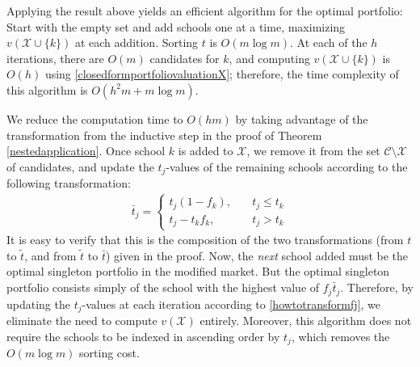 \documentclass[12pt]{article} %
\DeclareMathOperator*{\argmax}{arg\,max}
\newtheorem{theorem}{Theorem}
\theoremstyle{definition}
\newtheorem{theorem}{정리}
\theoremstyle{definition}
\begin{document}
Applying the result above yields an efficient algorithm for the optimal portfolio: Start with the empty set and add schools one at a time, maximizing $v(\mathcal{X}\cup \{k\})$ at each addition. Sorting $t$ is  $O(m \log m)$.  At each of the $h$ iterations, there are $O(m)$ candidates for $k$, and computing $v(\mathcal{X}\cup \{k\})$ is $O(h)$ using \eqref{closedformportfoliovaluationX}; therefore, the time complexity of this algorithm is $O(h^2 m + m \log m)$. 
%

We reduce the computation time to $O(hm)$ by taking advantage of the transformation from the inductive step in the proof of Theorem \ref{nestedapplication}. Once school $k$ is added to $\mathcal{X}$, we remove it from the set $\mathcal{C}\setminus \mathcal{X}$ of candidates, and update the $t_j$-values of the remaining schools according to the following transformation:
\begin{align}\label{howtotransformfj}
\bar t_j = 
\begin{cases}
t_j (1 - f_k), \quad & t_j \leq t_k \\
t_j - t_k f_k, \quad& t_j > t_k
\end{cases}
\end{align}
It is easy to verify that this is the composition of the two transformations (from $t$ to $\tilde t$, and from $\tilde t$ to $\bar t$) given in the proof. Now, the \emph{next} school added must be the optimal singleton portfolio in the modified market. But the optimal singleton portfolio consists simply of the school with the highest value of $f_j \bar t_j$. Therefore, by updating the $t_j$-values at each iteration according to \eqref{howtotransformfj}, we eliminate the need to compute $v(\mathcal{X})$ entirely. Moreover, this algorithm does not require the schools to be indexed in ascending order by $t_j$, which removes the $O(m\log m)$ sorting cost.
 
\end{document}
